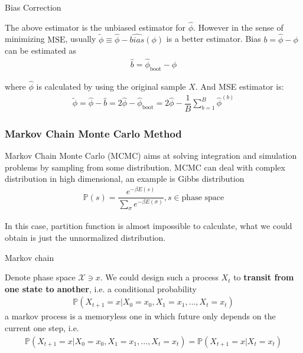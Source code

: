     
\begin{point}
    Bias Correction
\end{point}

    The above estimator is the unbiased estimator for $ \hat{\phi } $. However in the sense of minimizing $ \mathrm{MSE}  $, usually $ \tilde{\phi }\equiv \hat{\phi}-\hat{bias}(\phi) $ is a better estimator. Bias $ b=\hat{\phi }-\phi  $ can be estimated as
    \begin{align}
         \hat{b}=\hat{\phi }_\mathrm{boot}-\hat{\phi } 
    \end{align}
    
    where $ \hat{\phi } $ is calculated by using the original sample $ X $. And MSE estimator is:
    \begin{align}
        \tilde{\phi }= \hat{\phi }-\hat{b}=2\hat{\phi }-\hat{\phi }_\mathrm{boot}=2\hat{\phi }-\dfrac{1}{B}\sum_{b=1}^B\hat{\phi }^{(b)} 
    \end{align}
    
    

\subsubsection{Markov Chain Monte Carlo Method}\label{SubSubSectionMCMCAlgorithm}
Markov Chain Monte Carlo (MCMC) aims at solving integration and simulation problems by sampling from some distribution. MCMC can deal with complex distribution in high dimensional, an example is Gibbs distribution
\begin{align}
    \mathbb{P}\left( s \right) =\dfrac{e^{-\beta E(s)}}{\sum_{\sigma }e^{-\beta E(\sigma )}}, s\in\text{phase space} 
\end{align}

    In this case, partition function is almost impossible to calculate, what we could obtain is just the unnormalized distribution.
    
\begin{point}
    Markov chain
\end{point}

    Denote phase space $ \mathcal{X}\ni x $. We could design such a process $ X_t $ to \textbf{transit from one state to another}, i.e. a conditional probability
    \begin{align}
        \mathbb{P}\left( X_{t+1}=x|X_0=x_0,X_1=x_1,\ldots ,X_t=x_t \right)  
    \end{align}
    a markov process is a memoryless one in which future only depends on the current one step, i.e.
    \begin{align}
        \mathbb{P}\left( X_{t+1}=x|X_0=x_0,X_1=x_1,\ldots ,X_t=x_t \right)  =\mathbb{P}\left( X_{t+1}=x|X_t=x_t \right) 
    \end{align}

